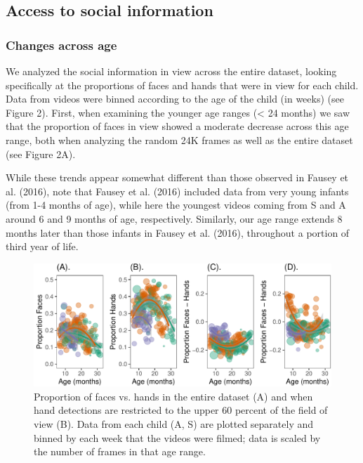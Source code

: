 \documentclass[10pt, letterpaper]{article}
\newenvironment{CodeChunk}{}{}
\begin{document}
\subsection{Access to social
information}\label{access-to-social-information}

\subsubsection{Changes across age}\label{changes-across-age}

We analyzed the social information in view across the entire dataset,
looking specifically at the proportions of faces and hands that were in
view for each child. Data from videos were binned according to the age
of the child (in weeks) (see Figure 2). First, when examining the
younger age ranges (\textless{} 24 months) we saw that the proportion of
faces in view showed a moderate decrease across this age range, both
when analyzing the random 24K frames as well as the entire dataset (see
Figure 2A).

While these trends appear somewhat different than those observed in
Fausey et al. (2016), note that Fausey et al. (2016) included data from
very young infants (from 1-4 months of age), while here the youngest
videos coming from S and A around 6 and 9 months of age, respectively.
Similarly, our age range extends 8 months later than those infants in
Fausey et al. (2016), throughout a portion of third year of life.

\begin{CodeChunk}
\begin{figure}[h]

{\centering \includegraphics{figs/FaceVsHands-1} 

}

\caption[Proportion of faces vs]{Proportion of faces vs. hands in the entire dataset (A) and when hand detections are restricted to the upper 60 percent of the field of view (B). Data from each child (A, S) are plotted separately and binned by each week that the videos were filmed; data is scaled by the number of frames in that age range.}\label{fig:FaceVsHands}
\end{figure}
\end{CodeChunk}
\end{document}
